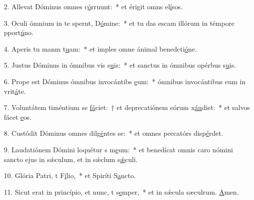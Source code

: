2. Allevat Dóminus omnes  c\uline{ó}rruunt:~* et érigit omns el\uline{í}sos.\par 
3. Oculi ómnium in te spernt, D\uline{ó}mine:~* et tu das escam illórum in témpore pport\uline{ú}no.\par 
4. Aperis tu manm t\uline{u}am:~* et imples omne ánimal benedcti\uline{ó}ne.\par 
5. Justus Dóminus in ómnibus vis s\uline{u}is:~* et sanctus in ómnibus opérbus s\uline{u}is.\par 
6. Prope est Dóminus ómnibus invocántibs \uline{e}um:~* ómnibus invocántibus eum in vrit\uline{á}te.\par 
7. Voluntátem timéntium se \uline{fá}ciet:~† et deprecatiónem eórum x\uline{áu}diet:~* et salvos fácet \uline{e}os.\par 
8. Custódit Dóminus omnes dilg\uline{é}ntes se:~* et omnes peccatórs disp\uline{é}rdet.\par 
9. Laudatiónem Dómini loquétur s m\uline{e}um:~* et benedícat omnis caro nómini sancto ejus in sǽculum, et in sǽclum s\uline{ǽ}culi.\par 
10. Glória Patri, t F\uline{í}lio,~* et Spiríti S\uline{a}ncto.\par 
11. Sicut erat in princípio, et nunc, t s\uline{e}mper,~* et in sǽcula sæculrum. \uline{A}men.\par 
